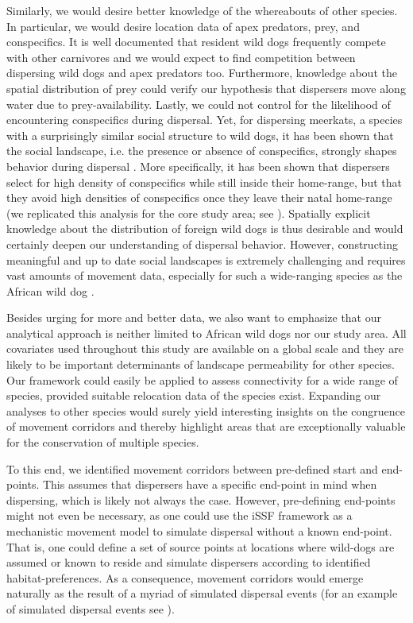 \documentclass[abstract=on,10pt,a4paper,bibliography=totocnumbered]{scrartcl}
\begin{document}
Similarly, we would desire better knowledge of the whereabouts of other species.
In particular, we would desire location data of apex predators, prey, and
conspecifics. It is well documented that resident wild dogs frequently compete
with other carnivores \citep{Creel.1998} and we would expect to find competition
between dispersing wild dogs and apex predators too. Furthermore, knowledge
about the spatial distribution of prey could verify our hypothesis that
dispersers move along water due to prey-availability. Lastly, we could not
control for the likelihood of encountering conspecifics during dispersal. Yet,
for dispersing meerkats, a species with a surprisingly similar social structure
to wild dogs, it has been shown that the social landscape, i.e. the presence or
absence of conspecifics, strongly shapes behavior during dispersal
\citep{Cozzi.2018}. More specifically, it has been shown that dispersers select
for high density of conspecifics while still inside their home-range, but that
they avoid high densities of conspecifics once they leave their natal home-range
(we replicated this analysis for the core study area; see
). Spatially explicit knowledge about the
distribution of foreign wild dogs is thus desirable and would certainly deepen
our understanding of dispersal behavior. However, constructing meaningful and up
to date social landscapes is extremely challenging and requires vast amounts of
movement data, especially for such a wide-ranging species as the African wild
dog \citep{Pomilia.2015}.

Besides urging for more and better data, we also want to emphasize that our
analytical approach is neither limited to African wild dogs nor our study area.
All covariates used throughout this study are available on a global scale and
they are likely to be important determinants of landscape permeability for other
species. Our framework could easily be applied to assess connectivity for a wide
range of species, provided suitable relocation data of the species exist.
Expanding our analyses to other species would surely yield interesting insights
on the congruence of movement corridors and thereby highlight areas that are
exceptionally valuable for the conservation of multiple species.

To this end, we identified movement corridors between pre-defined start and
end-points. This assumes that dispersers have a specific end-point in mind when
dispersing, which is likely not always the case. However, pre-defining
end-points might not even be necessary, as one could use the iSSF framework as a
mechanistic movement model to simulate dispersal without a known end-point. That
is, one could define a set of source points at locations where wild-dogs are
assumed or known to reside and simulate dispersers according to identified
habitat-preferences. As a consequence, movement corridors would emerge naturally
as the result of a myriad of simulated dispersal events (for an example of
simulated dispersal events see ).
\end{document}
